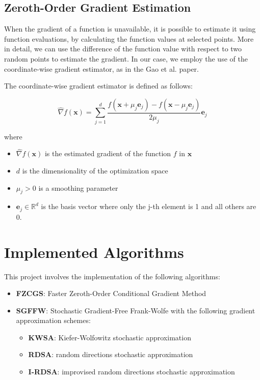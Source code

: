 \documentclass[10pt,twocolumn,letterpaper]{article}
\begin{document}
\subsection{Zeroth-Order Gradient Estimation}

When the gradient of a function is unavailable, it is possible to estimate it using function evaluations,
by calculating the function values at selected points. More in detail, we can use the difference of the
function value with respect to two random points to estimate the gradient. In our case, we employ the use of
the coordinate-wise gradient estimator, as in the Gao et al. paper.

The coordinate-wise gradient estimator is defined as follows:

\[
\hat{\nabla} f(\mathbf{x})=\sum_{j=1}^{d} \frac{f\left(\mathbf{x}+\mu_{j} \mathbf{e}_{j}\right)-f\left(\mathbf{x}-\mu_{j} \mathbf{e}_{j}\right)}{2 \mu_{j}} \mathbf{e}_{j}
\]

where

\begin{itemize}



\item $\hat{\nabla} f(\mathbf{x})$ is the estimated gradient of the function $f$ in $\mathbf{x}$

\item $d$ is the dimensionality of the optimization space

\item $\mu_{j}>0$ is a smoothing parameter

\item $\mathbf{e}_{j} \in \mathbb{R}^{d}$ is the basis vector where only the j-th element is 1 and all others are 0.

\end{itemize}

\section{Implemented Algorithms}

This project involves the implementation of the following algorithms:

\begin{itemize}
   \item \textbf{FZCGS}: Faster Zeroth-Order Conditional Gradient Method
   \item \textbf{SGFFW}: Stochastic Gradient-Free Frank-Wolfe with the following gradient approximation schemes:
      \begin{itemize}
         \item \textbf{KWSA}: Kiefer-Wolfowitz stochastic approximation
         \item \textbf{RDSA}: random directions stochastic approximation
         \item \textbf{I-RDSA}: improvised random directions stochastic approximation
      \end{itemize}
\end{itemize}
\end{document}
